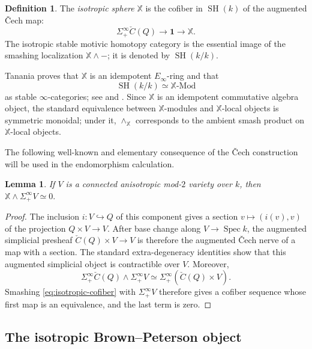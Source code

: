 \documentclass[11pt]{amsart}
\numberwithin{equation}{section}
\newtheorem{lemma}[theorem]{Lemma}
\theoremstyle{definition}
\newtheorem{definition}[theorem]{Definition}
\theoremstyle{remark}
\DeclareMathOperator{\Spec}{Spec}
\DeclareMathOperator{\SH}{SH}
\newcommand{\X}{\mathbb X}
\newcommand{\one}{\mathbf 1}
\newcommand{\Mod}{\mathrm{Mod}}
\begin{document}
\begin{definition}\label{def:isotropic-sphere}
The \emph{isotropic sphere} $\X$ is the cofiber in $\SH(k)$ of the augmented
\v{C}ech map:
\begin{equation}\label{eq:isotropic-cofiber}
  \Sigma^\infty_+\check C(Q)\longrightarrow\one\longrightarrow\X.
\end{equation}
The isotropic stable motivic homotopy category is the essential image of the
smashing localization $\X\wedge-$; it is denoted by $\SH(k/k)$.
\end{definition}

Tanania proves that $\X$ is an idempotent $E_\infty$-ring and that
\[
  \SH(k/k)\simeq\X\text{-}\Mod
\]
as stable $\infty$-categories; see
\cite[Proposition~6.1]{TananiaStable} and
\cite[Proposition~3.5]{TananiaCellular}.
Since $\X$ is an idempotent commutative algebra object, the standard
equivalence between $\X$-modules and $\X$-local objects is symmetric
monoidal; under it, $\wedge_{\X}$ corresponds to the ambient smash product
on $\X$-local objects.

The following well-known and elementary consequence of the \v{C}ech construction will be
used in the endomorphism calculation.

\begin{lemma}
\label{lem:anisotropic-killed}
If $V$ is a connected anisotropic mod-$2$ variety over $k$, then
$\X\wedge\Sigma^\infty_+V\simeq0.$
\end{lemma}

\begin{proof}
The inclusion
$i\colon V\hookrightarrow Q$ of this component gives a section
$v\mapsto(i(v),v)$ of the projection $Q\times V\to V$.  After base
change along $V\to\Spec k$, the augmented simplicial presheaf
$\check C(Q)\times V\to V$ is therefore the augmented \v{C}ech nerve of a
map with a section.  The standard extra-degeneracy identities
show that this augmented simplicial object is contractible over $V$.  Moreover,
\[
  \Sigma^\infty_+\check C(Q)\wedge\Sigma^\infty_+V
  \simeq
  \Sigma^\infty_+(\check C(Q)\times V).
\]
Smashing \eqref{eq:isotropic-cofiber} with $\Sigma^\infty_+V$ therefore gives
a cofiber sequence whose first map is an equivalence, and the last term is zero.
\end{proof}

\subsection{The isotropic Brown--Peterson object}
\end{document}
